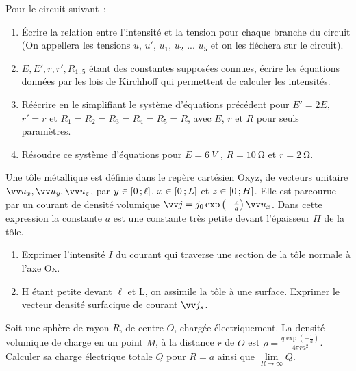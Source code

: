 \begin{exercice}
  Pour le circuit suivant~:
  \begin{enumerate}
  \item Écrire la relation entre l'intensité et la tension pour chaque branche du circuit (On appellera les tensions \(u\), \(u'\), \(u_1\), \(u_2\) ... \(u_5\) et on les fléchera sur le circuit).
  \item \(E, E', r, r', R_{1 .. 5}\) étant des constantes supposées connues, écrire les équations données par les lois de Kirchhoff qui permettent de calculer les intensités.
  \item Réécrire en le simplifiant le système d'équations précédent pour \(E' = 2 E\), \(r' = r\) et \(R_1 = R_2 = R_3 = R_4 = R_5 = R\), avec \(E\), \(r\) et \(R\) pour seuls paramètres.
  \item Résoudre ce système d'équations pour \(E = \SI{6}{V}\) , \(R = \SI{10}{\ohm}\) et \(r = \SI{2}{\ohm}\).
  \end{enumerate}
\end{exercice}
\begin{exercice}
  Une tôle métallique est définie dans le repère cartésien Oxyz, de vecteurs unitaire \(\ux, \uy, \uz\), par \(y \in \left[ 0 \, ;  \ell \right]\), \(x \in \left[ 0 \, ;  L \right]\) et \(z \in \left[ 0 \, ;  H \right]\). Elle est parcourue par un courant de densité volumique \(\vj = j_0 \exp\left(-\frac{z}{a}\right) \ux\). Dans cette expression la constante \(a\) est une constante très petite devant l'épaisseur \(H\) de la tôle.
  \begin{enumerate}
  \item Exprimer l'intensité \(I\) du courant qui traverse une section de la tôle normale à l'axe Ox.
  \item H étant petite devant \(\ell\) et L, on assimile la tôle à une surface. Exprimer le vecteur densité surfacique de courant \(\vj_s\).
  \end{enumerate}
\end{exercice}
\begin{exercice}
  Soit une sphère de rayon \(R\), de centre \(O\), chargée électriquement. La densité volumique de charge en un point \(M\), à la distance \(r\) de \(O\) est \(\rho = \frac{q \exp\left(-\frac{r}{a}\right)}{4 \pi r a^2}\). Calculer sa charge électrique totale \(Q\) pour \(R = a\) ainsi que \(\lim\limits_{R \to \infty} Q\).
\end{exercice}

